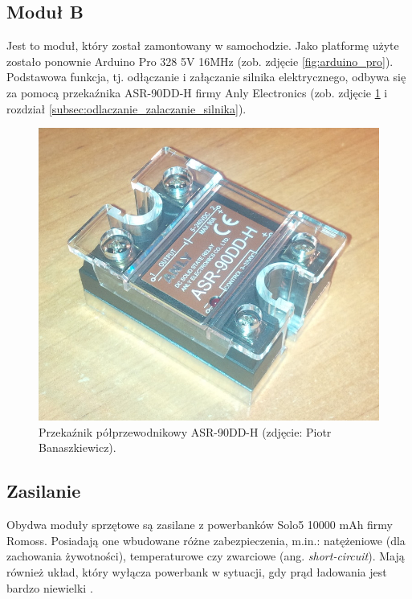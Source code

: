 \subsection{Moduł B}
\label{subsec:modul_b}

Jest to moduł, który został zamontowany w samochodzie. Jako platformę użyte zostało ponownie Arduino Pro 328 5V 16MHz \cite{Ard00} (zob. zdjęcie \ref{fig:arduino_pro}). Podstawowa funkcja, tj. odłączanie i załączanie silnika elektrycznego, odbywa się za pomocą przekaźnika ASR-90DD-H firmy Anly Electronics (zob. zdjęcie \ref{fig:SSR_relay} i rozdział \ref{subsec:odlaczanie_zalaczanie_silnika}).

\begin{figure}[h]
	\centering
	\includegraphics[scale=0.3]{pics/Anly_ASR90DDH.jpg}
	\caption{\label{fig:SSR_relay}Przekaźnik półprzewodnikowy ASR-90DD-H  (zdjęcie: Piotr Banaszkiewicz).}
\end{figure}

\subsection{Zasilanie}
\label{subsec:zasilanie}

Obydwa moduły sprzętowe są zasilane z powerbanków Solo5 10000 mAh firmy Romoss. Posiadają one wbudowane różne zabezpieczenia, m.in.: natężeniowe (dla zachowania żywotności), temperaturowe czy zwarciowe (ang. \textit{short-circuit}). Mają również układ, który wyłącza powerbank w sytuacji, gdy prąd ładowania jest bardzo niewielki \cite{Romoss}.

